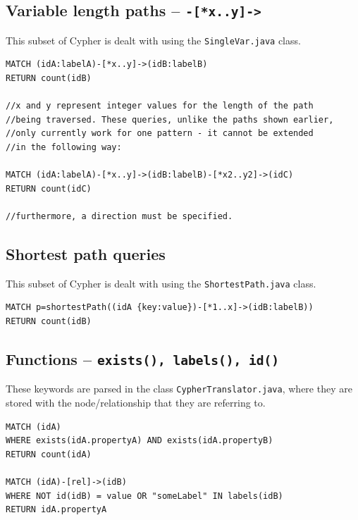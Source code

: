 \documentclass[letterpaper]{ltxdoc}
\begin{document}
\subsection*{Variable length paths -- \texttt{-[*x..y]->}}
This subset of Cypher is dealt with using the \texttt{SingleVar.java} class.

\medskip

\begin{lstlisting}[language = Cypher]
MATCH (idA:labelA)-[*x..y]->(idB:labelB)
RETURN count(idB)

//x and y represent integer values for the length of the path
//being traversed. These queries, unlike the paths shown earlier,
//only currently work for one pattern - it cannot be extended
//in the following way:

MATCH (idA:labelA)-[*x..y]->(idB:labelB)-[*x2..y2]->(idC)
RETURN count(idC)

//furthermore, a direction must be specified.
\end{lstlisting}

\subsection*{Shortest path queries}
This subset of Cypher is dealt with using the \texttt{ShortestPath.java} class.

\medskip

\begin{lstlisting}[language = Cypher]
MATCH p=shortestPath((idA {key:value})-[*1..x]->(idB:labelB))
RETURN count(idB)
\end{lstlisting}

\subsection*{Functions -- \texttt{exists(), labels(), id()}}
These keywords are parsed in the class \texttt{CypherTranslator.java}, where they are stored with the node/relationship that they are referring to.

\medskip

\begin{lstlisting}[language = Cypher]
MATCH (idA)
WHERE exists(idA.propertyA) AND exists(idA.propertyB)
RETURN count(idA)

MATCH (idA)-[rel]->(idB)
WHERE NOT id(idB) = value OR "someLabel" IN labels(idB)
RETURN idA.propertyA
\end{lstlisting}

\newpage
\end{document}
